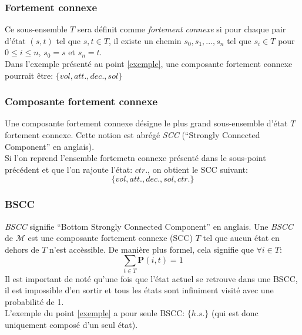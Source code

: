 \documentclass[letterpaper]{article}
\begin{document}
    \subsubsection{Fortement connexe}
      Ce sous-ensemble $T$ sera définit comme \textit{fortement connexe} si
      pour chaque pair d'état $(s, t)$ tel que $s, t \in T$, il existe un
      chemin $s_0, s_1, ..., s_n$ tel que $s_i \in T$ pour $0 \leq i \leq n$, 
      $s_0 = s$ et $s_n = t$.\\
      Dans l'exemple présenté au point \ref{exemple}, une composante fortement
      connexe pourrait être: $\{vol, att., dec., sol\}$
      
    \subsubsection{Composante fortement connexe}
      Une composante fortement connexe désigne le plus grand sous-ensemble 
      d'état $T$ fortement connexe. Cette notion est abrégé \textit{SCC} 
      (``Strongly Connected Component'' en anglais).\\
      Si l'on reprend l'ensemble fortemetn connexe présenté dans le sous-point
      précédent et que l'on rajoute l'état: $ctr.$, on obtient le SCC suivant:
      $$\{vol, att., dec., sol, ctr.\}$$
      
    \subsubsection{BSCC}
      \textit{BSCC} signifie ``Bottom Strongly Connected Component'' en anglais.
      Une \textit{BSCC} de $\mathcal{M}$ est une composante fortement connexe 
      (SCC) $T$ tel que aucun état en dehors de $T$ n'est accèssible.  De manière
      plus formel, cela signifie que $\forall i \in T$:
      $$\sum\limits_{t \in T} \mathbf{P}(i, t) = 1$$
      Il est important de noté qu'une fois que l'état actuel se retrouve dans une
      BSCC, il est impossible d'en sortir et tous les états sont infiniment visité
      avec une probabilité de 1.\\ %
      L'exemple du point \ref{exemple} a pour seule BSCC: $\{h.s.\}$ (qui 
      est donc uniquement composé d'un seul état).
      
      
  
\end{document}
